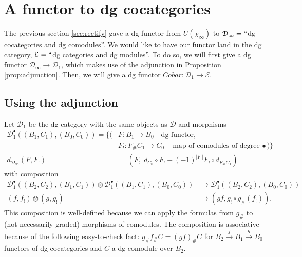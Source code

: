 \section{A functor to dg cocategories}
The previous section \ref{sec:rectify}
gave a dg functor from $U(\chi_\infty)$ 
to $\mathcal{D}_\infty = ``$dg cocategories 
and dg comodules''. We would like to have our 
functor land in the dg category, 
$\mathcal{E} = ``$dg categories and dg 
modules''. To do so, we will first give a 
dg functor $\mathcal{D}_\infty \to 
\mathcal{D}_1$, 
which makes use of the adjunction in 
Proposition \ref{prop:adjunction}. Then, 
we will give a dg functor $Cobar: 
\mathcal{D}_1 \to \mathcal{E}$.

\subsection{Using the adjunction}
Let $\mathcal{D}_1$ be the 
dg category with the same objects 
as $\mathcal{D}$ and morphisms
\begin{align*}
\mathcal{D}_1^\bullet(
  (B_1, C_1), (B_0,C_0))
= \big\{ \big(
& F: 
B_1 \to B_0 \quad \textrm{dg functor},\\
& F_!:
F_{\#}C_1 \to C_0 \quad \textrm{map of 
comodules of degree $\bullet$}
\big) \big\}\\
d_{\mathcal{D}_\infty}(F,F_!)
&=
(F,\; d_{C_0} \circ F_! - (-1)^{|F_!|} 
F_! \circ d_{F_\# C_1})
\end{align*}
with composition
\begin{align*}  
\mathcal{D}_1^\bullet(
  (B_2, C_2), (B_1, C_1)) \otimes  
  \mathcal{D}_1^\bullet(
  (B_1, C_1), (B_0, C_0))
&\to
\mathcal{D}_1^\bullet(
  (B_2, C_2), (B_0, C_0))\\
(f,f_!) \otimes (g, g_!)
&\mapsto
(gf, g_!\circ g_\#(f_!)).
\end{align*}
This composition is well-defined because 
we can apply the formulas from $g_\#$ to 
(not necessarily graded) morphisms of 
comodules. The composition is associative 
because of the following easy-to-check 
fact: $g_\#f_\#C = (gf)_\#C$ for 
$B_2 \xrightarrow{f} B_1 \xrightarrow{g} 
B_0$ functors of dg cocategories and $C$ 
a dg comodule over $B_2$.


